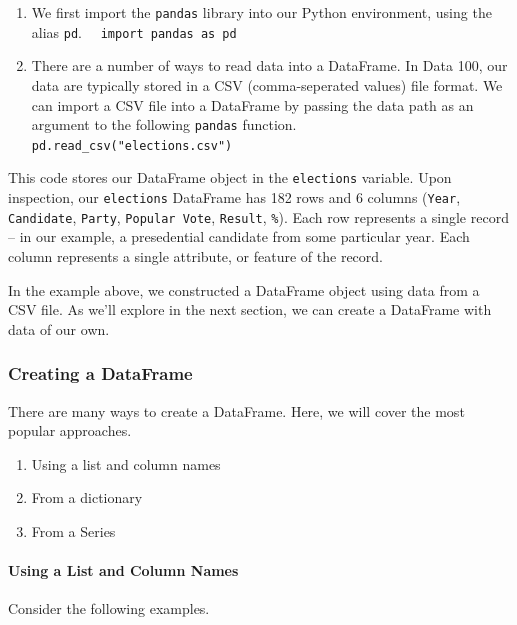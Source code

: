 \documentclass[
  letterpaper,
  DIV=11,
  numbers=noendperiod]{scrreprt}
\let\oldparagraph\paragraph
\renewcommand{\paragraph}[1]{\oldparagraph{#1}\mbox{}}
\providecommand{\tightlist}{%
  \setlength{\itemsep}{0pt}\setlength{\parskip}{0pt}}\usepackage{longtable,booktabs,array}
\begin{document}
\begin{enumerate}
\def\labelenumi{\arabic{enumi}.}
\item
  We first import the \texttt{pandas} library into our Python
  environment, using the alias \texttt{pd}.
   \texttt{import\ pandas\ as\ pd}
\item
  There are a number of ways to read data into a DataFrame. In Data 100,
  our data are typically stored in a CSV (comma-seperated values) file
  format. We can import a CSV file into a DataFrame by passing the data
  path as an argument to the following \texttt{pandas} function.
   \texttt{pd.read\_csv("elections.csv")}
\end{enumerate}

This code stores our DataFrame object in the \texttt{elections}
variable. Upon inspection, our \texttt{elections} DataFrame has 182 rows
and 6 columns (\texttt{Year}, \texttt{Candidate}, \texttt{Party},
\texttt{Popular\ Vote}, \texttt{Result}, \texttt{\%}). Each row
represents a single record -- in our example, a presedential candidate
from some particular year. Each column represents a single attribute, or
feature of the record.

In the example above, we constructed a DataFrame object using data from
a CSV file. As we'll explore in the next section, we can create a
DataFrame with data of our own.

\hypertarget{creating-a-dataframe}{%
\subsubsection{Creating a DataFrame}\label{creating-a-dataframe}}

There are many ways to create a DataFrame. Here, we will cover the most
popular approaches.

\begin{enumerate}
\def\labelenumi{\arabic{enumi}.}
\tightlist
\item
  Using a list and column names
\item
  From a dictionary
\item
  From a Series
\end{enumerate}

\hypertarget{using-a-list-and-column-names}{%
\paragraph{Using a List and Column
Names}\label{using-a-list-and-column-names}}

Consider the following examples.
\end{document}
